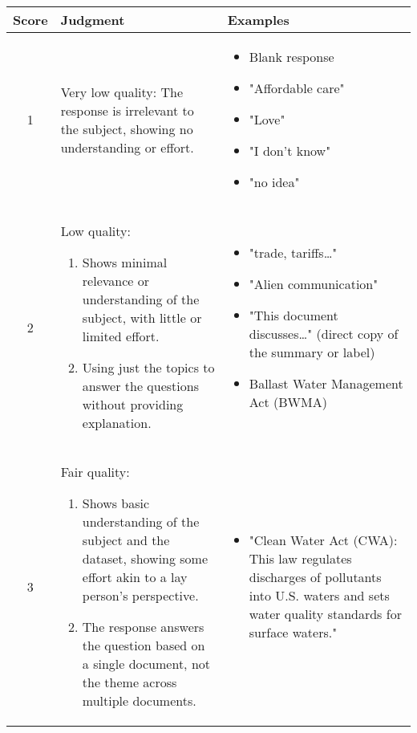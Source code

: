 \begin{table*}[h]
    \centering
    \small
    \renewcommand{\arraystretch}{1.2}
    \begin{tabular}{c|p{}|p{}}
    \toprule
    \textbf{Score} & \textbf{Judgment} & \textbf{Examples} \\
    \midrule
    1 & Very low quality: The response is irrelevant to the subject, showing no understanding or effort. & 
    \begin{itemize}[leftmargin=*]
        \item Blank response
        \item "Affordable care"
        \item "Love"
        \item "I don't know"
        \item "no idea"
    \end{itemize} \\
    \midrule
    2 & Low quality:
    \begin{enumerate}[leftmargin=*]
        \item Shows minimal relevance or understanding of the subject, with little or limited effort.
        \item Using just the topics to answer the questions without providing explanation.
    \end{enumerate} & 
    \begin{itemize}[leftmargin=*]
        \item "trade, tariffs…"
        \item "Alien communication"
        \item "This document discusses…" (direct copy of the summary or label)
        \item Ballast Water Management Act (BWMA)
    \end{itemize} \\
    \midrule
    3 & Fair quality:
    \begin{enumerate}[leftmargin=*]
        \item Shows basic understanding of the subject and the dataset, showing some effort akin to a lay person's perspective.
        \item The response answers the question based on a single document, not the theme across multiple documents.
    \end{enumerate} & 
    \begin{itemize}[leftmargin=*]
        \item "Clean Water Act (CWA): This law regulates discharges of pollutants into U.S. waters and sets water quality standards for surface waters."

\end{itemize}
\end{tabular}
\end{table*}
